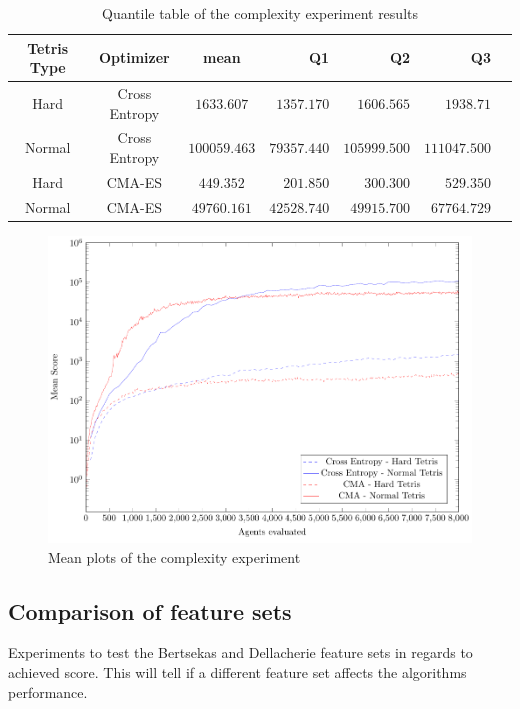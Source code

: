 \begin{table}[H]
\centering
\small
\begin{tabular}{c c c r r r r}
Tetris Type & Optimizer & mean & Q1 & Q2 & Q3\\
\hline
Hard & Cross Entropy & $1633.607$ & $1357.170$ & $1606.565$ & $1938.71$\\
Normal & Cross Entropy & $100059.463$ & $79357.440$ & $105999.500$ & $111047.500$\\
Hard & CMA-ES & $449.352$ & $201.850$ & $300.300$ & $529.350$\\
Normal & CMA-ES & $49760.161$ & $42528.740$ & $49915.700$ & $67764.729$\\
\end{tabular}
\caption{Quantile table of the complexity experiment results}
\end{table}

\begin{figure}[H]
\centering
\includegraphics[scale=1]{data/complexity/mean/PlotFile.pdf}
\caption{Mean plots of the complexity experiment}
\end{figure}

\clearpage

\subsection{Comparison of feature sets}
Experiments to test the Bertsekas and Dellacherie feature sets in regards to achieved score. This will tell if a different feature set affects the algorithms performance. 

